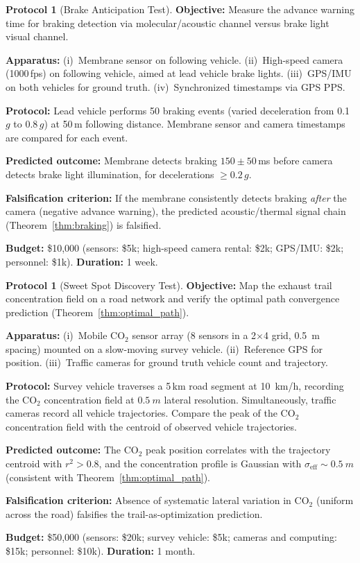 \documentclass[11pt,twocolumn,a4paper]{article}
\theoremstyle{plain}
\theoremstyle{definition}
\newtheorem{protocol}[theorem]{Protocol}
\theoremstyle{remark}
\begin{document}
\begin{protocol}[Brake Anticipation Test]
\label{prot:brake}
\textbf{Objective:} Measure the advance warning time for braking detection via molecular/acoustic channel versus brake light visual channel.

\textbf{Apparatus:} (i)~Membrane sensor on following vehicle. (ii)~High-speed camera (1000\,fps) on following vehicle, aimed at lead vehicle brake lights. (iii)~GPS/IMU on both vehicles for ground truth. (iv)~Synchronized timestamps via GPS PPS.

\textbf{Protocol:} Lead vehicle performs 50 braking events (varied deceleration from 0.1\,$g$ to 0.8\,$g$) at 50\,m following distance. Membrane sensor and camera timestamps are compared for each event.

\textbf{Predicted outcome:} Membrane detects braking $150 \pm 50$\,ms before camera detects brake light illumination, for decelerations $\geq 0.2\,g$.

\textbf{Falsification criterion:} If the membrane consistently detects braking \emph{after} the camera (negative advance warning), the predicted acoustic/thermal signal chain (Theorem~\ref{thm:braking}) is falsified.

\textbf{Budget:} \$10{,}000 (sensors: \$5k; high-speed camera rental: \$2k; GPS/IMU: \$2k; personnel: \$1k). \textbf{Duration:} 1 week.
\end{protocol}

\begin{protocol}[Sweet Spot Discovery Test]
\label{prot:sweet_spot}
\textbf{Objective:} Map the exhaust trail concentration field on a road network and verify the optimal path convergence prediction (Theorem~\ref{thm:optimal_path}).

\textbf{Apparatus:} (i)~Mobile CO$_2$ sensor array (8 sensors in a 2$\times$4 grid, \SI{0.5}{m} spacing) mounted on a slow-moving survey vehicle. (ii)~Reference GPS for position. (iii)~Traffic cameras for ground truth vehicle count and trajectory.

\textbf{Protocol:} Survey vehicle traverses a 5\,km road segment at \SI{10}{km/h}, recording the CO$_2$ concentration field at $\SI{0.5}{m}$ lateral resolution. Simultaneously, traffic cameras record all vehicle trajectories. Compare the peak of the CO$_2$ concentration field with the centroid of observed vehicle trajectories.

\textbf{Predicted outcome:} The CO$_2$ peak position correlates with the trajectory centroid with $r^2 > 0.8$, and the concentration profile is Gaussian with $\sigma_{\mathrm{eff}} \sim \SI{0.5}{m}$ (consistent with Theorem~\ref{thm:optimal_path}).

\textbf{Falsification criterion:} Absence of systematic lateral variation in CO$_2$ (uniform across the road) falsifies the trail-as-optimization prediction.

\textbf{Budget:} \$50{,}000 (sensors: \$20k; survey vehicle: \$5k; cameras and computing: \$15k; personnel: \$10k). \textbf{Duration:} 1 month.
\end{protocol}
\end{document}
